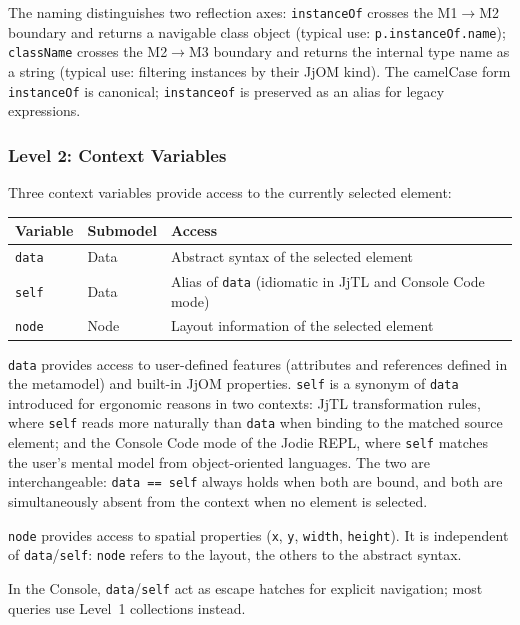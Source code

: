 \documentclass[11pt,a4paper]{article}
\begin{document}
The naming distinguishes two reflection axes: \texttt{instanceOf} crosses the M1$\to$M2 boundary and returns a navigable class object (typical use: \texttt{p.instanceOf.name}); \texttt{className} crosses the M2$\to$M3 boundary and returns the internal type name as a string (typical use: filtering instances by their JjOM kind). The camelCase form \texttt{instanceOf} is canonical; \texttt{instanceof} is preserved as an alias for legacy expressions.

\subsubsection{Level 2: Context Variables}

Three context variables provide access to the currently selected element:

\begin{center}
\begin{tabular}{@{}lll@{}}
\toprule
\textbf{Variable} & \textbf{Submodel} & \textbf{Access} \\
\midrule
\texttt{data} & Data & Abstract syntax of the selected element \\
\texttt{self} & Data & Alias of \texttt{data} (idiomatic in JjTL and Console Code mode) \\
\texttt{node} & Node & Layout information of the selected element \\
\bottomrule
\end{tabular}
\end{center}

\texttt{data} provides access to user-defined features (attributes and references defined in the metamodel) and built-in JjOM properties. \texttt{self} is a synonym of \texttt{data} introduced for ergonomic reasons in two contexts: JjTL transformation rules, where \texttt{self} reads more naturally than \texttt{data} when binding to the matched source element; and the Console Code mode of the Jodie REPL, where \texttt{self} matches the user's mental model from object-oriented languages. The two are interchangeable: \texttt{data == self} always holds when both are bound, and both are simultaneously absent from the context when no element is selected.

\texttt{node} provides access to spatial properties (\texttt{x}, \texttt{y}, \texttt{width}, \texttt{height}). It is independent of \texttt{data}/\texttt{self}: \texttt{node} refers to the layout, the others to the abstract syntax.

In the Console, \texttt{data}/\texttt{self} act as escape hatches for explicit navigation; most queries use Level~1 collections instead.
\end{document}
